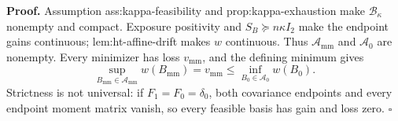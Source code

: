 \textbf{Proof.}
Assumption ass:kappa-feasibility and prop:kappa-exhaustion make \(\mathcal B_\kappa\) nonempty and compact.  Exposure positivity and \(S_B\succeq n\kappa I_2\) make the endpoint gains continuous; lem:ht-affine-drift makes \(w\) continuous.  Thus \(\mathcal A_{\mathrm{mm}}\) and \(\mathcal A_0\) are nonempty.  Every minimizer has loss \(v_{\mathrm{mm}}\), and the defining minimum gives
\[
\sup_{B_{\mathrm{mm}}\in\mathcal A_{\mathrm{mm}}}w(B_{\mathrm{mm}})
=v_{\mathrm{mm}}
\le\inf_{B_0\in\mathcal A_0}w(B_0).
\]
Strictness is not universal: if \(F_1=F_0=\delta_0\), both covariance endpoints and every endpoint moment matrix vanish, so every feasible basis has gain and loss zero. \(\square\)